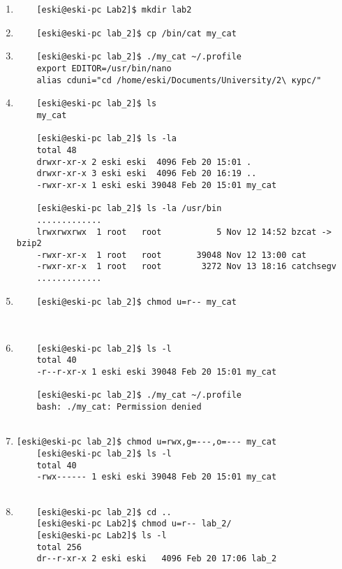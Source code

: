 \documentclass{article}
\begin{document}
\large
\begin{enumerate}
	\item \begin{verbatim}
	[eski@eski-pc Lab2]$ mkdir lab2
	\end{verbatim}
	\item \begin{verbatim}
	[eski@eski-pc lab_2]$ cp /bin/cat my_cat
	\end{verbatim}
	\item \begin{verbatim}
	[eski@eski-pc lab_2]$ ./my_cat ~/.profile 
	export EDITOR=/usr/bin/nano
	alias cduni="cd /home/eski/Documents/University/2\ курс/"
	\end{verbatim}
	\item \begin{verbatim}
	[eski@eski-pc lab_2]$ ls
	my_cat
	
	[eski@eski-pc lab_2]$ ls -la
	total 48
	drwxr-xr-x 2 eski eski  4096 Feb 20 15:01 .
	drwxr-xr-x 3 eski eski  4096 Feb 20 16:19 ..
	-rwxr-xr-x 1 eski eski 39048 Feb 20 15:01 my_cat
	
	[eski@eski-pc lab_2]$ ls -la /usr/bin
	.............
	lrwxrwxrwx  1 root   root           5 Nov 12 14:52 bzcat -> bzip2
	-rwxr-xr-x  1 root   root       39048 Nov 12 13:00 cat
	-rwxr-xr-x  1 root   root        3272 Nov 13 18:16 catchsegv
	.............
	\end{verbatim}
	\item \begin{verbatim}
	[eski@eski-pc lab_2]$ chmod u=r-- my_cat

	
	\end{verbatim}
	\item \begin{verbatim}
	[eski@eski-pc lab_2]$ ls -l
	total 40
	-r--r-xr-x 1 eski eski 39048 Feb 20 15:01 my_cat
	
	[eski@eski-pc lab_2]$ ./my_cat ~/.profile
	bash: ./my_cat: Permission denied
	
	\end{verbatim}
	\item \begin{verbatim}[eski@eski-pc lab_2]$ chmod u=rwx,g=---,o=--- my_cat 
	[eski@eski-pc lab_2]$ ls -l
	total 40
	-rwx------ 1 eski eski 39048 Feb 20 15:01 my_cat
	
	\end{verbatim}
	\item \begin{verbatim}
	[eski@eski-pc lab_2]$ cd ..
	[eski@eski-pc Lab2]$ chmod u=r-- lab_2/
	[eski@eski-pc Lab2]$ ls -l
	total 256
	dr--r-xr-x 2 eski eski   4096 Feb 20 17:06 lab_2
	

\end{verbatim}
\end{enumerate}
\end{document}
